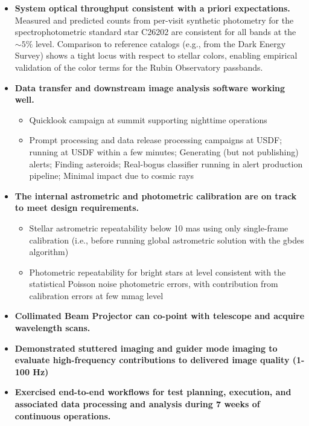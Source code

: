 \begin{itemize}
    \item \textbf{System optical throughput consistent with a priori expectations.} Measured and predicted counts from per-visit synthetic photometry for the spectrophotometric standard star C26202 are consistent for all bands at the $\sim5\%$ level.
    Comparison to reference catalogs (e.g., from the Dark Energy Survey) shows a tight locus with respect to stellar colors, enabling empirical validation of the color terms for the Rubin Observatory passbands.
    \item \textbf{Data transfer and downstream image analysis software working well.}
    \begin{itemize}
        \item Quicklook campaign at summit supporting nighttime operations
        \item Prompt processing and data release processing campaigns at USDF; running at USDF within a few minutes; Generating (but not publishing) alerts; Finding asteroids; Real-bogus classifier running in alert production pipeline; Minimal impact due to cosmic rays
    \end{itemize}
    \item \textbf{The internal astrometric and photometric calibration are on track to meet design requirements.}
    \begin{itemize}
        \item Stellar astrometric repeatability below 10 mas using only single-frame calibration (i.e., before running global astrometric solution with the gbdes algorithm)
        \item Photometric repeatability for bright stars at level consistent with the statistical Poisson noise photometric errors, with contribution from calibration errors at few mmag level
    \end{itemize}
    \item \textbf{Collimated Beam Projector can co-point with telescope and acquire wavelength scans.}
    \item \textbf{Demonstrated stuttered imaging and guider mode imaging to evaluate high-frequency contributions to delivered image quality (1-100 Hz)}
    \item \textbf{Exercised end-to-end workflows for test planning, execution, and associated data processing and analysis during 7 weeks of continuous operations.}
    \begin{itemize}

\end{itemize}
\end{itemize}

